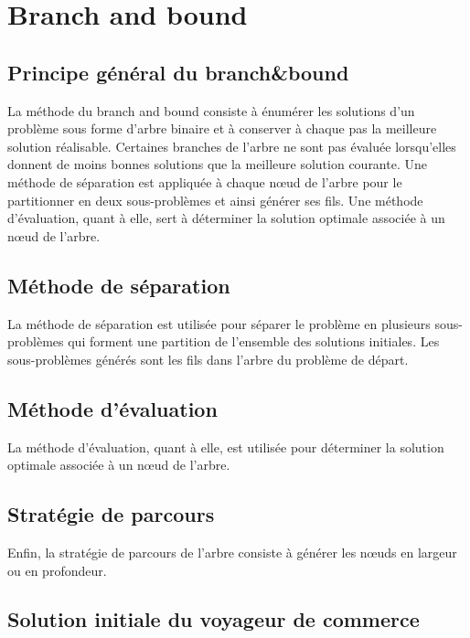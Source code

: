 
\section{Branch and bound}

\subsection{Principe général du branch\&bound}
La méthode du branch and bound consiste à énumérer les solutions d'un problème sous forme d'arbre binaire et à conserver à chaque pas la meilleure solution réalisable. Certaines branches de l'arbre ne sont pas évaluée lorsqu'elles donnent de moins bonnes solutions que la meilleure solution courante. Une méthode de séparation est appliquée à chaque nœud de l'arbre pour le partitionner en deux sous-problèmes et ainsi générer ses fils. Une méthode d'évaluation, quant à elle, sert à déterminer la solution optimale associée à un nœud de l'arbre.

\subsection{Méthode de séparation}
La méthode de séparation est utilisée pour séparer le problème en plusieurs sous-problèmes qui forment une partition de l'ensemble des solutions initiales. Les sous-problèmes générés sont les fils dans l'arbre du problème de départ.


\subsection{Méthode d'évaluation}
La méthode d'évaluation, quant à elle, est utilisée pour déterminer la solution optimale associée à un nœud de l'arbre.


\subsection{Stratégie de parcours}
Enfin, la stratégie de parcours de l'arbre consiste à générer les nœuds en largeur ou en profondeur.


\subsection{Solution initiale du voyageur de commerce}


